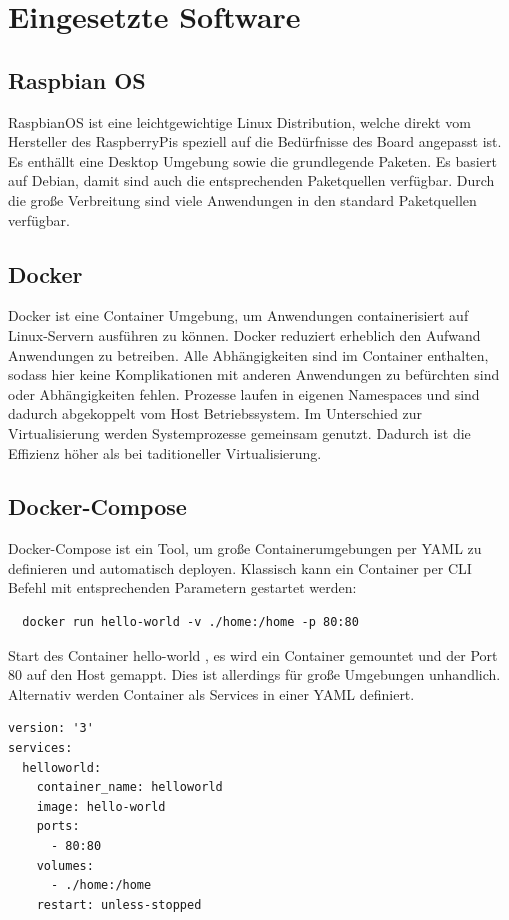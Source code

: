 \section{Eingesetzte Software}

\subsection{Raspbian OS}

RaspbianOS ist eine leichtgewichtige Linux Distribution, welche direkt vom Hersteller des RaspberryPis speziell auf die Bedürfnisse des Board angepasst ist. Es enthällt eine
Desktop Umgebung sowie die grundlegende Paketen. Es basiert auf Debian, damit sind auch die entsprechenden Paketquellen verfügbar. Durch die große Verbreitung 
sind viele Anwendungen in den standard Paketquellen verfügbar.

\subsection{Docker}

Docker ist eine Container Umgebung, um Anwendungen containerisiert auf Linux-Servern ausführen zu können. Docker reduziert erheblich den Aufwand 
Anwendungen zu betreiben. Alle Abhängigkeiten sind im Container enthalten, sodass hier keine Komplikationen mit anderen Anwendungen
zu befürchten sind oder Abhängigkeiten fehlen. Prozesse laufen in eigenen Namespaces und sind dadurch abgekoppelt vom Host Betriebssystem. Im Unterschied zur Virtualisierung werden
Systemprozesse gemeinsam genutzt. Dadurch ist die Effizienz höher als bei taditioneller Virtualisierung.

\subsection{Docker-Compose}

Docker-Compose ist ein Tool, um große Containerumgebungen per YAML zu definieren und automatisch deployen. Klassisch kann ein Container 
per CLI Befehl mit entsprechenden Parametern gestartet werden:
\begin{lstlisting}
  docker run hello-world -v ./home:/home -p 80:80
\end{lstlisting}
Start des Container \grqq hello-world \grqq{}, es wird ein Container gemountet und der Port 80 auf den Host gemappt.
Dies ist allerdings für große Umgebungen unhandlich. Alternativ werden Container als Services in einer YAML definiert.

\begin{lstlisting}
version: '3'
services:
  helloworld:
    container_name: helloworld
    image: hello-world
    ports:
      - 80:80
    volumes:
      - ./home:/home
    restart: unless-stopped
\end{lstlisting}

